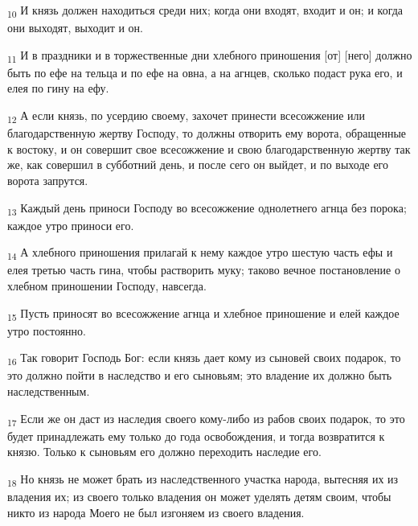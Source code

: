 \begin{tcolorbox}
\textsubscript{10} И князь должен находиться среди них; когда они входят, входит и он; и когда они выходят, выходит и он.
\end{tcolorbox}
\begin{tcolorbox}
\textsubscript{11} И в праздники и в торжественные дни хлебного приношения [от] [него] должно быть по ефе на тельца и по ефе на овна, а на агнцев, сколько подаст рука его, и елея по гину на ефу.
\end{tcolorbox}
\begin{tcolorbox}
\textsubscript{12} А если князь, по усердию своему, захочет принести всесожжение или благодарственную жертву Господу, то должны отворить ему ворота, обращенные к востоку, и он совершит свое всесожжение и свою благодарственную жертву так же, как совершил в субботний день, и после сего он выйдет, и по выходе его ворота запрутся.
\end{tcolorbox}
\begin{tcolorbox}
\textsubscript{13} Каждый день приноси Господу во всесожжение однолетнего агнца без порока; каждое утро приноси его.
\end{tcolorbox}
\begin{tcolorbox}
\textsubscript{14} А хлебного приношения прилагай к нему каждое утро шестую часть ефы и елея третью часть гина, чтобы растворить муку; таково вечное постановление о хлебном приношении Господу, навсегда.
\end{tcolorbox}
\begin{tcolorbox}
\textsubscript{15} Пусть приносят во всесожжение агнца и хлебное приношение и елей каждое утро постоянно.
\end{tcolorbox}
\begin{tcolorbox}
\textsubscript{16} Так говорит Господь Бог: если князь дает кому из сыновей своих подарок, то это должно пойти в наследство и его сыновьям; это владение их должно быть наследственным.
\end{tcolorbox}
\begin{tcolorbox}
\textsubscript{17} Если же он даст из наследия своего кому-либо из рабов своих подарок, то это будет принадлежать ему только до года освобождения, и тогда возвратится к князю. Только к сыновьям его должно переходить наследие его.
\end{tcolorbox}
\begin{tcolorbox}
\textsubscript{18} Но князь не может брать из наследственного участка народа, вытесняя их из владения их; из своего только владения он может уделять детям своим, чтобы никто из народа Моего не был изгоняем из своего владения.
\end{tcolorbox}
